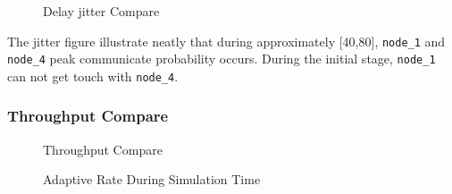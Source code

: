 \begin{figure}[H]
\begin{tabular}{l r}
    \end{tabular}
    \caption{Delay jitter Compare}
\end{figure}

The jitter figure illustrate neatly that during approximately [40,80], \verb|node_1| and \verb|node_4| peak communicate probability occurs. During the initial stage, \verb|node_1| can not get touch with \verb|node_4|.

\subsubsection{Throughput Compare}
\begin{figure}[H]
    \centering
    \caption{Throughput Compare}
\end{figure}

\begin{figure}[H]
    \centering
    \caption{Adaptive Rate During Simulation Time}
\end{figure}

